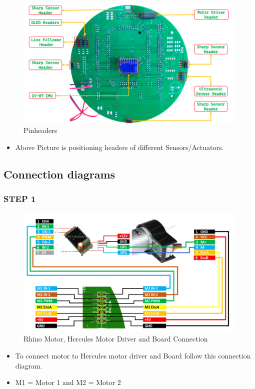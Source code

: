\documentclass[12pt,a4paper,oneside]{book}
\begin{document}
			\begin{figure}[H]
				\begin{center}
					\includegraphics[scale=0.45]{PCB_BACK_SIDE_1}
					\caption{Pinheaders}
				\end{center}
			\end{figure}
			\begin{itemize}
				\item Above Picture is positioning headers of different Sensors/Actuators. 
			\end{itemize}
			
			\pagebreak

			\subsection*{Connection diagrams}
		
		\subsubsection*{STEP 1}
				\begin{figure}[H]
					\begin{center}
						\includegraphics[scale=0.50]{Motor_Hercules_Connection}
						\caption{Rhino Motor, Hercules Motor Driver and Board Connection}
					\end{center}
				\end{figure}
				\begin{itemize}
					\item To connect motor to Hercules motor driver and Board follow this connection diagram.
					\item M1 = Motor 1 and M2 = Motor 2
				\end{itemize}
\end{document}

